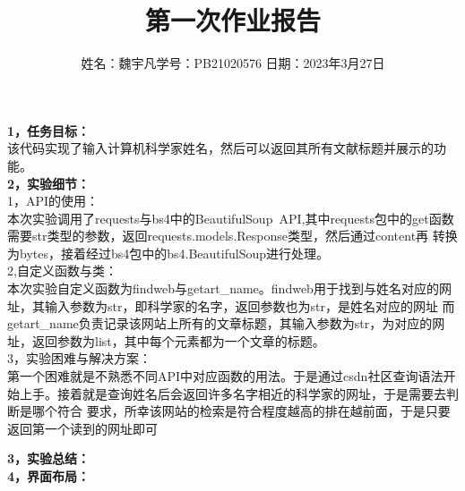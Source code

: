 \documentclass[UTF8,a4paper,11pt]{ctexart}
\title{第一次作业报告}
\author{姓名：魏宇凡\quad 学号：PB21020576 \quad 日期：2023年3月27日}
\date{}
\begin{document}
\maketitle



\setlength{\oddsidemargin}{ 1cm} %
\setlength{\evensidemargin}{\oddsidemargin}
\setlength{\textwidth}{13.50cm}

\vspace{-0.2cm}

\vspace{0.5cm}



\setlength{\oddsidemargin}{-.5cm} %
\setlength{\evensidemargin}{\oddsidemargin}
\setlength{\textwidth}{24.00cm}





{\large\textbf{1，任务目标：}}\\
该代码实现了输入计算机科学家姓名，然后可以返回其所有文献标题并展示的功能。\\


{\large\textbf{2，实验细节：}}\\


1，API的使用：\\
本次实验调用了requests与bs4中的BeautifulSoup\ API,其中requests包中的get函数需要str类型的参数，返回requests.models.Response类型，然后通过content再
转换为bytes，接着经过bs4包中的bs4.BeautifulSoup进行处理。\\



2,自定义函数与类：\\
本次实验自定义函数为findweb与getart_name。findweb用于找到与姓名对应的网址，其输入参数为str，即科学家的名字，返回参数也为str，是姓名对应的网址
而getart_name负责记录该网站上所有的文章标题，其输入参数为str，为对应的网址，返回参数为list，其中每个元素都为一个文章的标题。\\


3，实验困难与解决方案：\\
第一个困难就是不熟悉不同API中对应函数的用法。于是通过csdn社区查询语法开始上手。接着就是查询姓名后会返回许多名字相近的科学家的网址，于是需要去判断是哪个符合
要求，所幸该网站的检索是符合程度越高的排在越前面，于是只要返回第一个读到的网址即可



{\large\textbf{3，实验总结：}}\\




{\large\textbf{4，界面布局：}}\\

   
   
\end{document}
